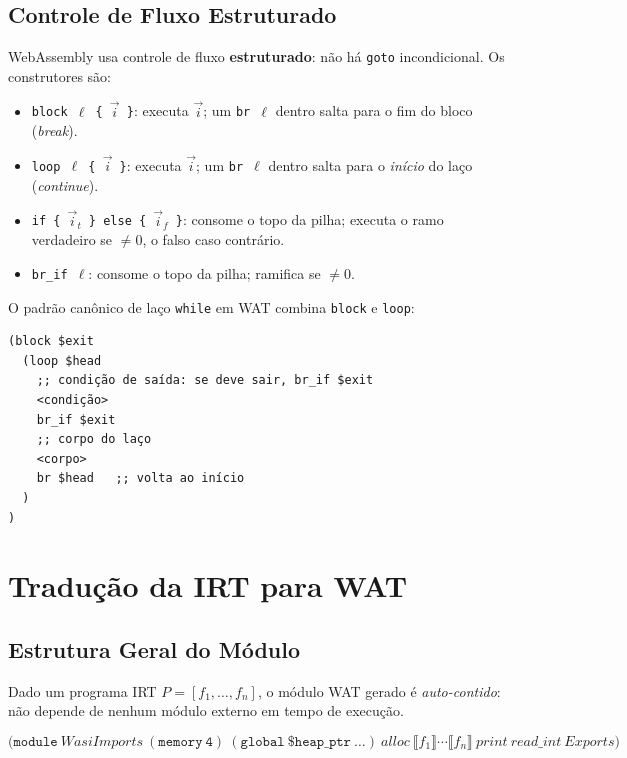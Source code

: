 \subsection{Controle de Fluxo Estruturado}

WebAssembly usa controle de fluxo \textbf{estruturado}: não há \texttt{goto}
incondicional.  Os construtores são:

\begin{itemize}
  \item \texttt{block $\ell$ \{ $\vec{i}$ \}}: executa $\vec{i}$; um
    \texttt{br $\ell$} dentro salta para o fim do bloco (\emph{break}).
  \item \texttt{loop $\ell$ \{ $\vec{i}$ \}}: executa $\vec{i}$; um
    \texttt{br $\ell$} dentro salta para o \emph{início} do laço (\emph{continue}).
  \item \texttt{if \{ $\vec{i}_t$ \} else \{ $\vec{i}_f$ \}}: consome o topo
    da pilha; executa o ramo verdadeiro se $\neq 0$, o falso caso contrário.
  \item \texttt{br\_if $\ell$}: consome o topo da pilha; ramifica se $\neq 0$.
\end{itemize}

O padrão canônico de laço \texttt{while} em WAT combina \texttt{block} e
\texttt{loop}:

\begin{verbatim}
(block $exit
  (loop $head
    ;; condição de saída: se deve sair, br_if $exit
    <condição>
    br_if $exit
    ;; corpo do laço
    <corpo>
    br $head   ;; volta ao início
  )
)
\end{verbatim}

\section{Tradução da IRT para WAT}\label{sec:irt-to-wat}

\subsection{Estrutura Geral do Módulo}

Dado um programa IRT $P = [f_1, \ldots, f_n]$, o módulo WAT gerado é
\emph{auto-contido}: não depende de nenhum módulo externo em tempo de execução.

\[
\mathtt{(module}\ \mathit{WasiImports}\ \mathtt{(memory\ 4)}\ \mathtt{(global\ \$heap\_ptr\ \ldots)}\ \mathit{alloc}\ \llbracket f_1 \rrbracket \cdots \llbracket f_n \rrbracket\ \mathit{print}\ \mathit{read\_int}\ \mathit{Exports}\mathtt{)}
\]

